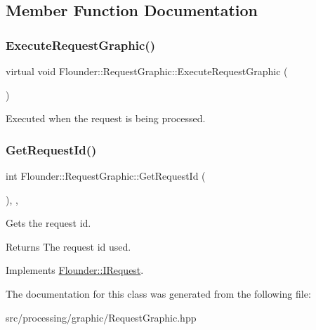 \subsection{Member Function Documentation}
\mbox{\label{class_flounder_1_1_request_graphic_a04554e0bf9b1feb987240e00bdf7f169}} 
\subsubsection{\texorpdfstring{Execute\+Request\+Graphic()}{ExecuteRequestGraphic()}}
{\footnotesize\ttfamily virtual void Flounder\+::\+Request\+Graphic\+::\+Execute\+Request\+Graphic (\begin{DoxyParamCaption}{ }\end{DoxyParamCaption})\hspace{0.3cm}{\ttfamily [pure virtual]}}



Executed when the request is being processed. 

\mbox{\label{class_flounder_1_1_request_graphic_a4480f0a81c8f8623619195cc6d87ef20}} 
\subsubsection{\texorpdfstring{Get\+Request\+Id()}{GetRequestId()}}
{\footnotesize\ttfamily int Flounder\+::\+Request\+Graphic\+::\+Get\+Request\+Id (\begin{DoxyParamCaption}{ }\end{DoxyParamCaption})\hspace{0.3cm}{\ttfamily [inline]}, {\ttfamily [override]}, {\ttfamily [virtual]}}



Gets the request id. 

\begin{DoxyReturn}{Returns}
The request id used. 
\end{DoxyReturn}


Implements \hyperlink{class_flounder_1_1_i_request_a13fa86b3ecc0b67101179291fdfca9bc}{Flounder\+::\+I\+Request}.



The documentation for this class was generated from the following file\+:\begin{DoxyCompactItemize}
\item 
src/processing/graphic/Request\+Graphic.\+hpp\end{DoxyCompactItemize}
